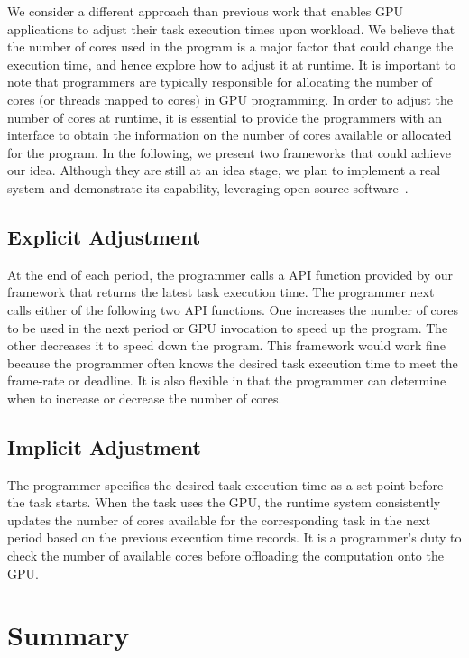 \documentclass[times, 10pt, twocolumn]{article}
\begin{document}
We consider a different approach than previous work that enables GPU
applications to adjust their task execution times upon workload.
We believe that the number of cores used in the program is a major
factor that could change the execution time, and hence explore how to
adjust it at runtime.
It is important to note that programmers are typically responsible for
allocating the number of cores (or threads mapped to cores) in GPU
programming.
In order to adjust the number of cores at runtime, it is essential to
provide the programmers with an interface to obtain the information on
the number of cores available or allocated for the program.
In the following, we present two frameworks that could achieve our idea.
Although they are still at an idea stage, we plan to implement a real
system and demonstrate its capability, leveraging open-source
software~\cite{Kato_OSPERT11}.

\subsection{Explicit Adjustment}

At the end of each period, the programmer calls a API function provided
by our framework that returns the latest task execution time.
The programmer next calls either of the following two API functions.
One increases the number of cores to be used in the next period or GPU
invocation to speed up the program.
The other decreases it to speed down the program.
This framework would work fine because the programmer often knows the
desired task execution time to meet the frame-rate or deadline.
It is also flexible in that the programmer can determine when to
increase or decrease the number of cores.

\subsection{Implicit Adjustment}

The programmer specifies the desired task execution time as a set point
before the task starts.
When the task uses the GPU, the runtime system consistently updates the
number of cores available for the corresponding task in the next period
based on the previous execution time records.
It is a programmer's duty to check the number of available cores before
offloading the computation onto the GPU.


\section{Summary}
\label{sec:summary}


{\footnotesize

}
\end{document}
